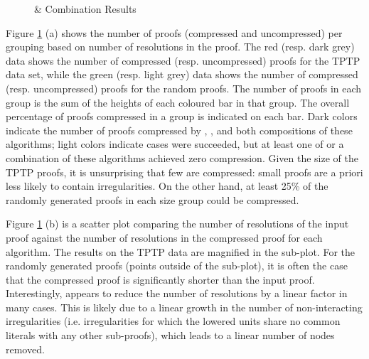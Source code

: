 {\begin{figure}[p]
 \caption{\GFOLU \& \FORPI Combination Results}
\label{fig:ex}

\end{figure}

Figure \ref{fig:ex} (a) shows the number of proofs (compressed and uncompressed) per grouping based on number of resolutions in the proof. The red (resp. dark grey) data shows the number of compressed (resp. uncompressed) proofs for the TPTP data set, while the green (resp. light grey) data shows the number of compressed (resp. uncompressed) proofs for the random proofs. The number of proofs in each group is the sum of the heights of each coloured bar in that group. The overall percentage of proofs compressed in a group is indicated on each bar. Dark colors indicate the number of proofs compressed by {\FORPI}, {\GFOLU}, and both compositions of these algorithms; light colors indicate cases were {\FORPI} succeeded, but at least one of {\GFOLU} or a combination of these algorithms achieved zero compression. 
Given the size of the TPTP proofs, it is unsurprising that few are compressed: small proofs are a priori less likely to contain irregularities. On the other hand, 
at least 25\% of the randomly generated proofs in each size group could be compressed.


Figure \ref{fig:ex} (b) is a scatter plot comparing the number of resolutions of the input proof against the number of resolutions in the compressed proof for each algorithm. The results on the TPTP data are magnified in the sub-plot. For the randomly generated proofs (points outside of the sub-plot), it is often the case that the compressed proof is significantly shorter than the input proof. Interestingly, {\GFOLU} appears to reduce the number of resolutions by a linear factor in many cases. This is likely due to a linear growth in the number of non-interacting irregularities (i.e. irregularities for which the lowered units share no common literals with any other sub-proofs), which leads to a linear number of nodes removed.


}
